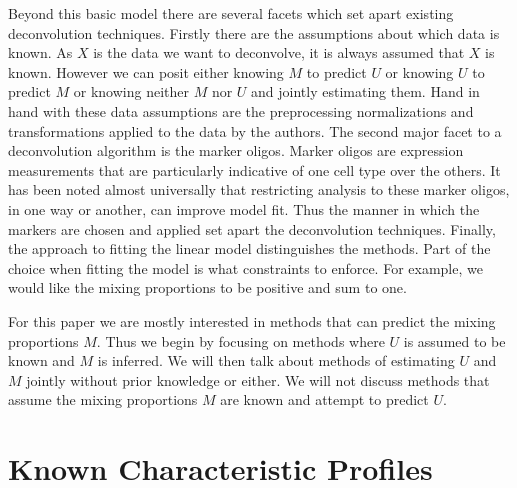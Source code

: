 \documentclass[reqno,12pt,oneside]{report}\usepackage[]{graphicx}\usepackage[]{color}
\theoremstyle{plain}
\theoremstyle{definition}
\theoremstyle{remark}
\numberwithin{theorem}{chapter}     %
\begin{document}
Beyond this basic model there are several facets which set apart existing deconvolution techniques. Firstly there are the assumptions about which data is known. As $X$ is the data we want to deconvolve, it is always assumed that $X$ is known. However we can posit either knowing $M$ to predict $U$ or knowing $U$ to predict $M$ or knowing neither $M$ nor $U$ and jointly estimating them. Hand in hand with these data assumptions are the preprocessing normalizations and transformations applied to the data by the authors. The second major facet to a deconvolution algorithm is the marker oligos. Marker oligos are expression measurements that are particularly indicative of one cell type over the others. It has been noted almost universally that restricting analysis to these marker oligos, in one way or another, can improve model fit. Thus the manner in which the markers are chosen and applied set apart the deconvolution techniques. Finally, the approach to fitting the linear model distinguishes the methods. Part of the choice when fitting the model is what constraints to enforce. For example, we would like the mixing proportions to be positive and sum to one.

For this paper we are mostly interested in methods that can predict the mixing proportions $M$. Thus we begin by focusing on methods where $U$ is assumed to be known and $M$ is inferred. We will then talk about methods of estimating $U$ and $M$ jointly without prior knowledge or either. We will not discuss methods that assume the mixing proportions $M$ are known and attempt to predict $U$.  

\section{Known Characteristic Profiles}
\label{litrev:knownu}
\end{document}
